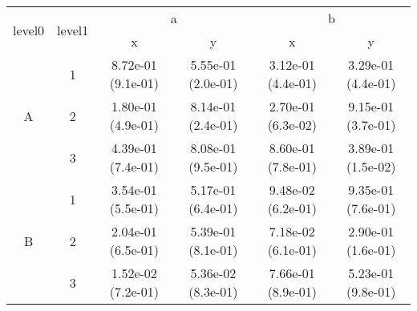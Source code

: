 \begin{tabular}{cccccc}
\toprule
\multirow{2}{*}{level0} & \multirow{2}{*}{level1}&\multicolumn{2}{c}{a}&\multicolumn{2}{c}{b}\tabularnewline
\cmidrule(lr){3-4}
\cmidrule(lr){5-6}
&&x&y&x&y\tabularnewline
\midrule
\multirow{3}{*}{A}&1& 8.72e-01 (9.1e-01)& 5.55e-01 (2.0e-01)& 3.12e-01 (4.4e-01)& 3.29e-01 (4.4e-01)\tabularnewline
&2& 1.80e-01 (4.9e-01)& 8.14e-01 (2.4e-01)& 2.70e-01 (6.3e-02)& 9.15e-01 (3.7e-01)\tabularnewline
&3& 4.39e-01 (7.4e-01)& 8.08e-01 (9.5e-01)& 8.60e-01 (7.8e-01)& 3.89e-01 (1.5e-02)\tabularnewline
\midrule
\multirow{3}{*}{B}&1& 3.54e-01 (5.5e-01)& 5.17e-01 (6.4e-01)& 9.48e-02 (6.2e-01)& 9.35e-01 (7.6e-01)\tabularnewline
&2& 2.04e-01 (6.5e-01)& 5.39e-01 (8.1e-01)& 7.18e-02 (6.1e-01)& 2.90e-01 (1.6e-01)\tabularnewline
&3& 1.52e-02 (7.2e-01)& 5.36e-02 (8.3e-01)& 7.66e-01 (8.9e-01)& 5.23e-01 (9.8e-01)\tabularnewline
\bottomrule
\end{tabular}
